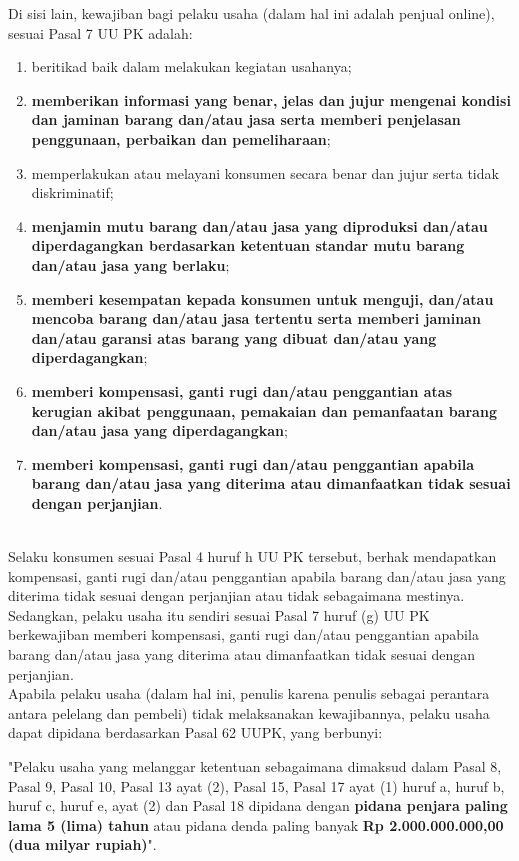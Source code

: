 \indent Di sisi lain, kewajiban bagi pelaku usaha (dalam hal ini adalah penjual online), sesuai Pasal 7 UU PK adalah:
\begin{enumerate}[label=\alph*.]
	\item beritikad baik dalam melakukan kegiatan usahanya;
	\item \textbf{memberikan informasi yang benar, jelas dan jujur mengenai kondisi dan jaminan barang dan/atau jasa serta memberi penjelasan penggunaan, perbaikan dan pemeliharaan};
	\item memperlakukan atau melayani konsumen secara benar dan jujur serta tidak diskriminatif;
	\item \textbf{menjamin mutu barang dan/atau jasa yang diproduksi dan/atau diperdagangkan berdasarkan ketentuan standar mutu barang dan/atau jasa yang berlaku};
	\item \textbf{memberi kesempatan kepada konsumen untuk menguji, dan/atau mencoba barang  dan/atau jasa tertentu serta memberi jaminan dan/atau garansi atas barang yang dibuat dan/atau yang diperdagangkan};
	\item \textbf{memberi kompensasi, ganti rugi dan/atau penggantian atas kerugian akibat penggunaan, pemakaian dan pemanfaatan barang dan/atau jasa yang diperdagangkan};
	\item \textbf{memberi kompensasi, ganti rugi dan/atau penggantian apabila barang dan/atau jasa yang diterima atau dimanfaatkan tidak sesuai dengan perjanjian}.
\end{enumerate}\ \\

\indent Selaku konsumen sesuai Pasal 4 huruf h UU PK tersebut, berhak mendapatkan kompensasi, ganti rugi dan/atau penggantian apabila barang dan/atau jasa yang diterima tidak sesuai dengan perjanjian atau tidak sebagaimana mestinya. Sedangkan, pelaku usaha itu sendiri sesuai Pasal 7 huruf (g) UU PK berkewajiban memberi kompensasi, ganti rugi dan/atau penggantian apabila barang dan/atau jasa yang diterima atau dimanfaatkan tidak sesuai dengan perjanjian.\\

\indent Apabila pelaku usaha (dalam hal ini, penulis karena penulis sebagai perantara antara pelelang dan pembeli) tidak melaksanakan kewajibannya, pelaku usaha dapat dipidana berdasarkan Pasal 62 UUPK, yang berbunyi:
\begin{displayquote}
	"Pelaku usaha yang melanggar ketentuan sebagaimana dimaksud dalam Pasal 8, Pasal 9, Pasal 10, Pasal 13 ayat (2), Pasal 15, Pasal 17 ayat (1) huruf a, huruf b, huruf c, huruf e, ayat (2) dan Pasal 18 dipidana dengan \textbf{pidana penjara paling lama 5 (lima) tahun} atau pidana denda paling banyak \textbf{Rp 2.000.000.000,00 (dua milyar rupiah)}".
\end{displayquote}

